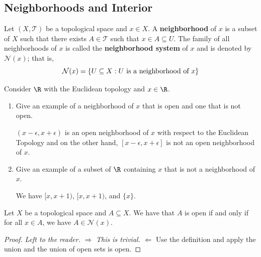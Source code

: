 \subsection{Neighborhoods and Interior}

\begin{definition}
   Let \( (X,\mathcal{T}) \) be a topological space and \( x \in X  \). A \textbf{neighborhood} of \( x  \) is a subset of \( X  \) such that there exists \( A \in \mathcal{T} \) such that \( x \in A \subseteq U  \). The family of all neighborhoods of \( x  \) is called the \textbf{neighborhood system} of \( x  \) and is denoted by \( \mathcal{N}(x) \); that is,  
   \[  \mathcal{N}(x) = \{  U \subseteq X : U \ \text{is a neighborhood of \( x  \)} \}  \]
\end{definition}

\begin{problem}
    Consider \( \R  \) with the Euclidean topology and \( x \in \R  \).
    \begin{enumerate}
        \item[(i)] Give an example of a neighborhood of \( x  \) that is open and one that is not open.
            \begin{solution}
                \( (x - \epsilon, x + \epsilon) \) is an open neighborhood of \( x  \) with respect to the Euclidean Topology  and on the other hand, \( [x- \epsilon, x + \epsilon] \) is not an open neighborhood of \( x  \).
            \end{solution}
        \item[(ii)] Give an example of a subset of \( \R  \) containing \( x  \) that is not a neighborhood of \( x  \).
            \begin{solution}
                We have \( [x, x + 1) \), \( [x, x+ 1) \), and \( \{ x  \}  \).
            \end{solution}
    \end{enumerate}
\end{problem}

\begin{prop}
    Let \( X  \) be a topological space and \( A \subseteq X  \). We have that \( A  \) is open if and only if for all \( x \in A  \), we have \( A \in \mathcal{N}(x) \).
\end{prop}
\begin{proof}
\textit{Left to the reader.} \( \Longrightarrow  \) \textit{This is trivial.}
\( \Longleftarrow \)  Use the definition and apply the union and the union of open sets is open.
\end{proof}


